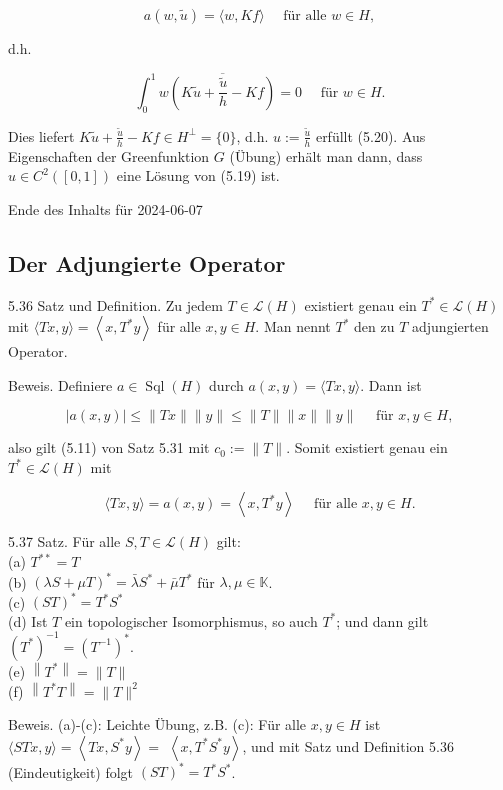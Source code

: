 \documentclass[10pt, letterpaper]{article}
\begin{document}
$$
a(w, \tilde{u})=\langle w, K f\rangle \quad \text { für alle } w \in H,
$$

d.h.

$$
\int_{0}^{1} w \overline{\left(K \tilde{u}+\frac{\tilde{u}}{h}-K f\right)}=0 \quad \text { für } w \in H .
$$

Dies liefert $K \tilde{u}+\frac{\tilde{u}}{h}-K f \in H^{\perp}=\{0\}$, d.h. $u:=\frac{\tilde{u}}{h}$ erfüllt (5.20). Aus Eigenschaften der Greenfunktion $G$ (Übung) erhält man dann, dass $u \in C^{2}([0,1])$ eine Lösung von (5.19) ist.

Ende des Inhalts für 2024-06-07

\subsection*{Der Adjungierte Operator}
5.36 Satz und Definition. Zu jedem $T \in \mathcal{L}(H)$ existiert genau ein $T^{*} \in \mathcal{L}(H)$ mit $\langle T x, y\rangle=\left\langle x, T^{*} y\right\rangle$ für alle $x, y \in H$. Man nennt $T^{*}$ den zu $T$ adjungierten Operator.

Beweis. Definiere $a \in \operatorname{Sql}(H)$ durch $a(x, y)=\langle T x, y\rangle$. Dann ist

$$
|a(x, y)| \leq\|T x\|\|y\| \leq\|T\|\|x\|\|y\| \quad \text { für } x, y \in H,
$$

also gilt (5.11) von Satz 5.31 mit $c_{0}:=\|T\|$. Somit existiert genau ein $T^{*} \in \mathcal{L}(H)$ mit

$$
\langle T x, y\rangle=a(x, y)=\left\langle x, T^{*} y\right\rangle \quad \text { für alle } x, y \in H .
$$

5.37 Satz. Für alle $S, T \in \mathcal{L}(H)$ gilt:\\
(a) $T^{* *}=T$\\
(b) $(\lambda S+\mu T)^{*}=\bar{\lambda} S^{*}+\bar{\mu} T^{*}$ für $\lambda, \mu \in \mathbb{K}$.\\
(c) $(S T)^{*}=T^{*} S^{*}$\\
(d) Ist $T$ ein topologischer Isomorphismus, so auch $T^{*}$; und dann gilt $\left(T^{*}\right)^{-1}=\left(T^{-1}\right)^{*}$.\\
(e) $\left\|T^{*}\right\|=\|T\|$\\
(f) $\left\|T^{*} T\right\|=\|T\|^{2}$

Beweis. (a)-(c): Leichte Übung, z.B. (c): Für alle $x, y \in H$ ist $\langle S T x, y\rangle=\left\langle T x, S^{*} y\right\rangle=$ $\left\langle x, T^{*} S^{*} y\right\rangle$, und mit Satz und Definition 5.36 (Eindeutigkeit) folgt $(S T)^{*}=T^{*} S^{*}$.
\end{document}
